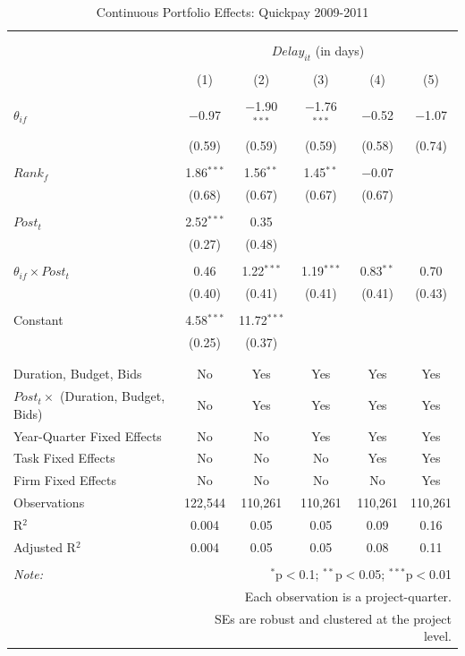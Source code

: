 \documentclass[
]{article}
\begin{document}
\begin{table}[H] \centering 
  \caption{Continuous Portfolio Effects: Quickpay 2009-2011} 
  \label{} 
\small 
\begin{tabular}{@{\extracolsep{-2pt}}lccccc} 
\\[-1.8ex]\hline 
\hline \\[-1.8ex] 
\\[-1.8ex] & \multicolumn{5}{c}{$Delay_{it}$ (in days)} \\ 
\\[-1.8ex] & (1) & (2) & (3) & (4) & (5)\\ 
\hline \\[-1.8ex] 
 $\theta_{if}$ & $-$0.97 & $-$1.90$^{***}$ & $-$1.76$^{***}$ & $-$0.52 & $-$1.07 \\ 
  & (0.59) & (0.59) & (0.59) & (0.58) & (0.74) \\ 
  & & & & & \\ 
 $Rank_f$ & 1.86$^{***}$ & 1.56$^{**}$ & 1.45$^{**}$ & $-$0.07 &  \\ 
  & (0.68) & (0.67) & (0.67) & (0.67) &  \\ 
  & & & & & \\ 
 $Post_t$ & 2.52$^{***}$ & 0.35 &  &  &  \\ 
  & (0.27) & (0.48) &  &  &  \\ 
  & & & & & \\ 
 $\theta_{if} \times Post_t$ & 0.46 & 1.22$^{***}$ & 1.19$^{***}$ & 0.83$^{**}$ & 0.70 \\ 
  & (0.40) & (0.41) & (0.41) & (0.41) & (0.43) \\ 
  & & & & & \\ 
 Constant & 4.58$^{***}$ & 11.72$^{***}$ &  &  &  \\ 
  & (0.25) & (0.37) &  &  &  \\ 
  & & & & & \\ 
\hline \\[-1.8ex] 
Duration, Budget, Bids & No & Yes & Yes & Yes & Yes \\ 
$Post_t \times$  (Duration, Budget, Bids) & No & Yes & Yes & Yes & Yes \\ 
Year-Quarter Fixed Effects & No & No & Yes & Yes & Yes \\ 
Task Fixed Effects & No & No & No & Yes & Yes \\ 
Firm Fixed Effects & No & No & No & No & Yes \\ 
Observations & 122,544 & 110,261 & 110,261 & 110,261 & 110,261 \\ 
R$^{2}$ & 0.004 & 0.05 & 0.05 & 0.09 & 0.16 \\ 
Adjusted R$^{2}$ & 0.004 & 0.05 & 0.05 & 0.08 & 0.11 \\ 
\hline 
\hline \\[-1.8ex] 
\textit{Note:}  & \multicolumn{5}{r}{$^{*}$p$<$0.1; $^{**}$p$<$0.05; $^{***}$p$<$0.01} \\ 
 & \multicolumn{5}{r}{Each observation is a project-quarter.} \\ 
 & \multicolumn{5}{r}{SEs are robust and clustered at the project level.} \\ 
\end{tabular} 
\end{table}
\end{document}
